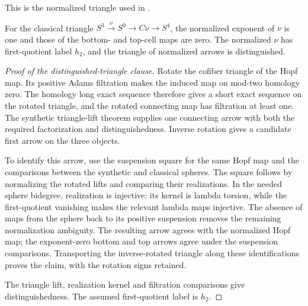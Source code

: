 \begin{proposition}
\label{sem:Literature:nu-cofiber}
This is the normalized triangle used in \cite[Example 6.19]{LWX126}.\par

For the classical triangle $S^3\xrightarrow{\nu}S^0\to C\nu\to S^4$, the normalized exponent of $\nu$ is one and those of the bottom- and top-cell maps are zero. The normalized $\nu$ has first-quotient label $h_2$, and the triangle of normalized arrows is distinguished.


\end{proposition}
\begin{proof}[Proof of the distinguished-triangle clause]
Rotate the cofiber triangle of the Hopf map. Its positive Adams
filtration makes the induced map on mod-two homology zero. The homology
long exact sequence therefore gives a short exact sequence on the
rotated triangle, and the rotated connecting map has filtration at
least one. The synthetic triangle-lift theorem supplies one
connecting arrow with both the required factorization and
distinguishedness. Inverse rotation gives a candidate first arrow on
the three objects.

To identify this arrow, use the suspension square for the same Hopf
map and the comparisons between the synthetic and classical
spheres. The square follows by normalizing the rotated lifts and
comparing their realizations. In the needed sphere bidegree,
realization is injective: its kernel is lambda torsion, while the
first-quotient vanishing makes the relevant lambda maps injective.
The absence of maps from the sphere back to its positive suspension
removes the remaining normalization ambiguity. The resulting arrow
agrees with the normalized Hopf map; the exponent-zero bottom
and top arrows agree under the suspension comparisons. Transporting
the inverse-rotated triangle along these identifications proves the
claim, with the rotation signs retained.

The triangle lift, realization kernel and filtration comparisons give
distinguishedness. The assumed first-quotient label is $h_2$.
\end{proof}


